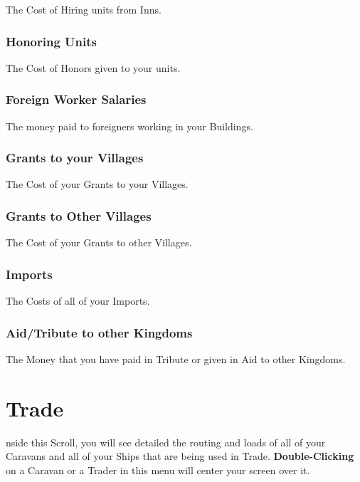 The Cost of Hiring units from Inns.

\subsubsection{\textsf{Honoring Units}}

The Cost of Honors given to your units.

\subsubsection{\textsf{Foreign Worker Salaries}}

The money paid to foreigners working in your Buildings.

\subsubsection{\textsf{Grants to your Villages}}

The Cost of your Grants to your Villages.

\subsubsection{\textsf{Grants to Other Villages}}

The Cost of your Grants to other Villages.

\subsubsection{\textsf{Imports}}

The Costs of all of your Imports.

\subsubsection{\textsf{Aid/Tribute to other Kingdom}s}

The Money that you have paid in Tribute or given in Aid to other Kingdoms.

\section{\textsf{Trade}}



nside this Scroll, you will see detailed the routing and loads of all of your Caravans and all of your Ships that are being used in Trade. \textbf{Double-Clicking} on a Caravan or a Trader in this menu will center your screen over it.

